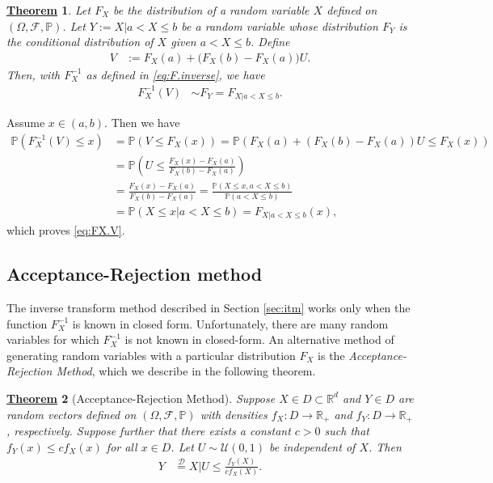 \documentclass[12pt]{book}
\numberwithin{equation}{chapter}
\theoremstyle{plain}
\newtheorem{theorem}{\underline{Theorem}}
\numberwithin{theorem}{section}
\theoremstyle{definition}
\numberwithin{exercise}{chapter}
\let\oldendproof\endproof
\renewenvironment{proof}[1][\proofname]{%
  \oldproof[\scshape\underline{#1}]%
}{\oldendproof}
\newcommand{\<}{\langle}
\renewcommand{\>}{\rangle}
\renewcommand{\(}{\left(}
\renewcommand{\)}{\right)}
\renewcommand{\[}{\left[}
\renewcommand{\]}{\right]}
\newcommand\Pb{\mathds{P}}
\newcommand\Rb{\mathds{R}}
\newcommand\Dc{\mathscr{D}}
\newcommand\Fc{\mathscr{F}}
\newcommand\Uc{\mathscr{U}}
\newcommand\Om{\Omega}
\begin{document}
\begin{theorem}
Let $F_X$ be the distribution of a random variable $X$ defined on $(\Om,\Fc,\Pb)$.  Let $Y:= X | a< X \leq b$ be a random variable whose distribution $F_Y$ is the conditional distribution of $X$ given $a < X \leq b$.  Define
\begin{align}
V
	&:=	F_X(a) + \Big( F_X(b) - F_X(a) \Big) U .
\end{align}
Then, with $F_X^{-1}$ as defined in \eqref{eq:F.inverse}, we have
\begin{align}
F_X^{-1}(V) 
	&\sim F_Y = F_{X|a<X\leq b}. \label{eq:FX.V}
\end{align}
\end{theorem}

\begin{proof}
Assume $x \in (a,b)$.  Then we have
\begin{align}
\Pb( F_X^{-1}(V) \leq x )
	&=	\Pb( V \leq F_X(x) )
	=		\Pb( F_X(a) + \( F_X(b) - F_X(a) \) U \leq F_X(x) ) \\
	&=	\Pb\( U \leq \frac{F_X(x) - F_X(a)}{F_X(b) - F_X(a)} \) \\
	&=	\frac{F_X(x) - F_X(a)}{F_X(b) - F_X(a)}
	=		\frac{ \Pb( X \leq x , a < X \leq b) }{\Pb(a < X \leq b)} \\
	&=	\Pb( X \leq x | a < X \leq b ) 
	=		F_{X|a<X\leq b}(x) ,
\end{align}
which proves \eqref{eq:FX.V}.
\end{proof}

\subsection{Acceptance-Rejection method}
The inverse transform method described in Section \ref{sec:itm} works only when the function $F_X^{-1}$ is known in closed form.  Unfortunately, there are many random variables for which $F_X^{-1}$ is not known in closed-form.  An alternative method of generating random variables with a particular distribution $F_X$ is the \emph{Acceptance-Rejection Method}, which we describe in the following theorem.

\begin{theorem}[Acceptance-Rejection Method]
\label{thm:arm}
Suppose $X \in D \subset \Rb^d$ and $Y \in D$ are random vectors defined on $(\Om,\Fc,\Pb)$ with densities $f_X: D \to \Rb_+$ and $f_Y: D \to \Rb_+$, respectively.  Suppose further that there exists a constant $c>0$ such that $f_Y(x) \leq c f_X(x)$ for all $x \in D$.  
Let $U \sim \Uc(0,1)$ be independent of $X$.  Then
\begin{align}
Y
	&\stackrel{\Dc}{=} X | U \leq \frac{f_Y(X)}{c f_X(X)} . \label{eq:arm}
\end{align}
\end{theorem}
\end{document}
